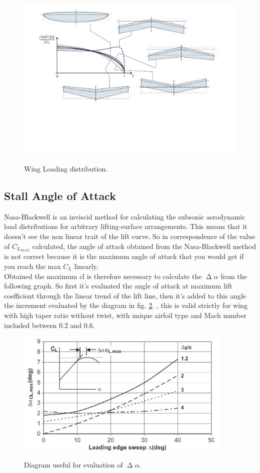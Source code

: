 \begin{figure}[H]
\centering
{\includegraphics[height=8cm]{Immagini/wing_loading_B}} 
\caption{Wing Loading distribution.}
\label{fig:wl}
\end{figure}

\subsection{Stall Angle of Attack}

Nasa-Blackwell is an inviscid method for calculating the subsonic aerodynamic load distributions for arbitrary lifting-surface arrangements. This means that it doesn't see the non linear trait of the lift curve. So in correspondence of the value of $C_{L_{MAX}}$ calculated, the angle of attack obtained from the Nasa-Blackwell method is not correct because it is the maximum angle of attack that you would get if you reach the max $C_L$ linearly.\\
Obtained the maximum cl is therefore necessary to calculate the $\upDelta \alpha$ from the following graph. So first it’s evaluated the angle of attack at maximum lift coefficient through the linear trend of the lift line, then it’s added to this angle the increment evaluated by the diagram in fig. \ref{fig:dealpha}. , this is valid strictly for wing with high taper ratio without twist, with unique airfoil type and Mach number included between 0.2 and 0.6.


\begin{figure}[H]
\centering
{\includegraphics[height=6cm]{Immagini/deltaAlphaSforza.png}} 
\caption{Diagram useful for evaluation of $\upDelta \alpha$.}
\label{fig:dealpha}
\end{figure}



